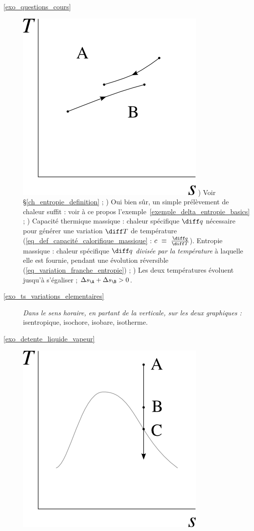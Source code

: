 \exercisesolutionpage
\titreresultats

	\begin{description}
		\item [\ref{exo_questions_cours}]
						\includegraphics[width=\solutiondiagramwidth]{images/exo_sol_ts_tasse.png}
						) Voir \S\ref{ch_entropie_definition} ;
						) Oui bien sûr, un simple prélèvement de chaleur suffit : voir à ce propos l’exemple~\ref{exemple_delta_entropie_basics} ;
						) Capacité thermique massique : chaleur spécifique $\diff q$ nécessaire pour générer une variation $\diff T$ de température (\cref{eq_def_capacité_calorifique_massique} : $c\ \equiv \ \frac{\diff q}{\diff T}$). Entropie massique : chaleur spécifique $\diff q$ \emph{divisée par la température} à laquelle elle est fournie, pendant une évolution réversible (\cref{eq_variation_franche_entropie}) ;
						) Les deux températures évoluent jusqu’à s’égaliser ; $\Delta s_\A + \Delta s_\B > 0$.
		\item [\ref{exo_ts_variations_elementaires}]
						\tab \textit{Dans le sens horaire, en partant de la verticale, sur les deux graphiques :} isentropique, isochore, isobare, isotherme.
		\item [\ref{exo_detente_liquide_vapeur}] 
						\includegraphics[width=\solutiondiagramwidth]{images/exo_sol_ts_detente_eau.png}

\end{description}
